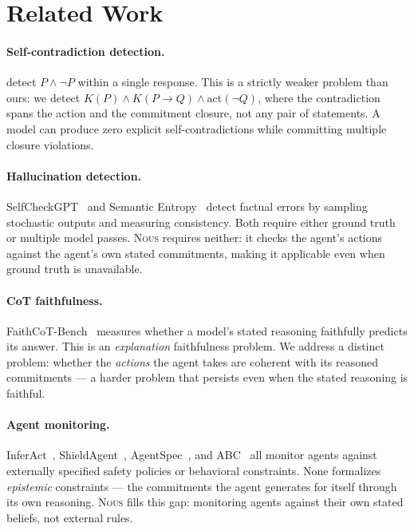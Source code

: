 \documentclass[11pt]{article}
\newcommand{\nous}{\textsc{Nous}} %
\begin{document}
\section{Related Work}
\label{sec:related}

\paragraph{Self-contradiction detection.}
\citet{mundler2024} detect $P \wedge \neg P$ within a single response.
This is a strictly weaker problem than ours: we detect $K(P) \wedge K(P \to Q)
\wedge \text{act}(\neg Q)$, where the contradiction spans the action and
the commitment closure, not any pair of statements.
A model can produce zero explicit self-contradictions while committing
multiple closure violations.

\paragraph{Hallucination detection.}
SelfCheckGPT~\citep{selfcheckgpt2023} and Semantic
Entropy~\citep{farquhar2024} detect factual errors by sampling stochastic
outputs and measuring consistency. Both require either ground truth or
multiple model passes. \nous{} requires neither: it checks the agent's
actions against the agent's own stated commitments, making it applicable
even when ground truth is unavailable.

\paragraph{CoT faithfulness.}
FaithCoT-Bench~\citep{faithcot2025} measures whether a model's stated
reasoning faithfully predicts its answer. This is an \emph{explanation}
faithfulness problem. We address a distinct problem: whether the
\emph{actions} the agent takes are coherent with its reasoned commitments —
a harder problem that persists even when the stated reasoning is faithful.

\paragraph{Agent monitoring.}
InferAct~\citep{inferact2025}, ShieldAgent~\citep{shieldagent2025},
AgentSpec~\citep{agentspec2025}, and ABC~\citep{abc2026} all monitor agents
against externally specified safety policies or behavioral constraints.
None formalizes \emph{epistemic} constraints — the commitments the agent
generates for itself through its own reasoning. \nous{} fills this gap:
monitoring agents against their own stated beliefs, not external rules.
\end{document}
